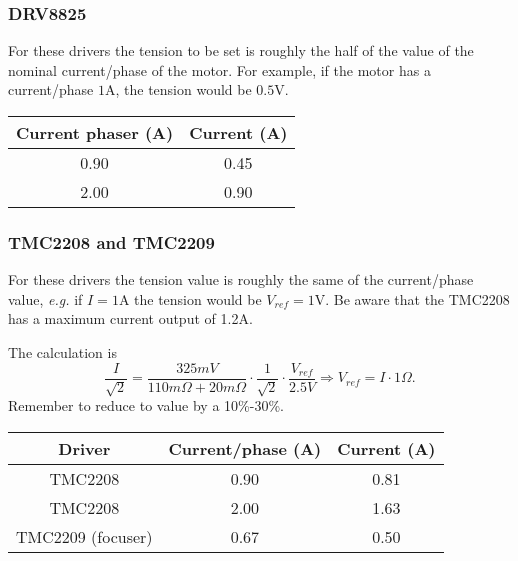 \subsubsection{DRV8825}
For these drivers the tension to be set is roughly the half of the value of the nominal current/phase of the motor.
For example, if the motor has a current/phase \(1\)A, the tension would be \(0.5\)V.

\begin{minipage}
    {.4\textwidth}
    \begin{tabular}{cc}
        Current phaser (A) & Current (A) \\
        \hline
        0.90 & 0.45 \\
        2.00 & 0.90             
    \end{tabular}
    \label{tab:drivers_curr}
\end{minipage} 

\subsubsection{TMC2208 and TMC2209}
For these drivers the tension value is roughly the same of the current/phase value, \textit{e.g.} if \(I=1\)A the tension would be \(V_{ref}=1\)V.
Be aware that the TMC2208 has a maximum current output of 1.2A.

The calculation is 
\[\frac{I}{\sqrt{2}}=\frac{325mV}{110m\Omega+20m\Omega}\cdot\frac{1}{\sqrt{2}}\cdot\frac{V_{ref}}{2.5V}\Rightarrow V_{ref} = I \cdot 1\Omega.\]
Remember to reduce to value by a 10\%-30\%.

\begin{minipage}
    {.4\textwidth}
    \begin{tabular}{ccc}
       Driver & Current/phase (A) & Current (A) \\
        \hline
       TMC2208 & 0.90 & 0.81 \\
       TMC2208 &  2.00 & 1.63 \\                
       TMC2209 (focuser) &  0.67 & 0.50                
    \end{tabular}
    \label{tab:drivers_curr}
\end{minipage} 



